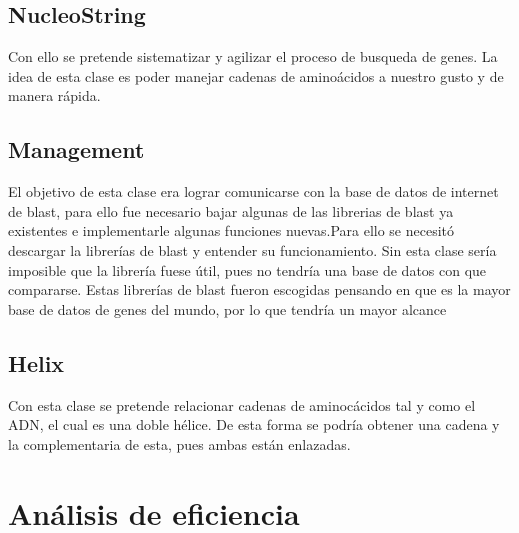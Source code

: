 \documentclass{article}
\begin{document}
\subsection{NucleoString}
	Con ello se pretende sistematizar y agilizar el proceso de busqueda de genes. La idea de esta clase es poder manejar cadenas de aminoácidos a nuestro gusto y de manera rápida.
	
\subsection{Management}
	El objetivo de esta clase era lograr comunicarse con la base de datos de internet de blast, para ello fue necesario bajar algunas de las librerias de blast ya existentes e implementarle algunas funciones nuevas.Para ello se necesitó descargar la librerías de blast y entender su funcionamiento. Sin esta clase sería imposible que la librería fuese útil, pues no tendría una base de datos con que compararse. Estas librerías de blast fueron escogidas pensando en que es la mayor base de datos de genes del mundo, por lo que tendría un mayor alcance
	
\subsection{Helix}
	Con esta clase se pretende relacionar cadenas de aminocácidos tal y como el ADN, el cual es una doble hélice. De esta forma se podría obtener una cadena y la complementaria de esta, pues ambas están enlazadas. 


\section{Análisis de eficiencia}

\end{document}
